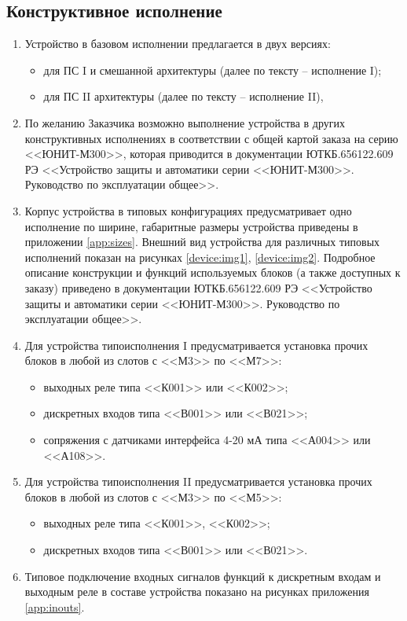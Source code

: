 \color{uniblue}\subsection{Конструктивное исполнение}
\color{black}

\begin{enumerate}

\item
Устройство в базовом исполнении предлагается в двух версиях:
\begin{itemize} 
\item для ПС I и смешанной архитектуры (далее по тексту – исполнение I); 
\item для ПС II архитектуры (далее по тексту – исполнение II), 
\end{itemize} 

\item
По желанию Заказчика возможно выполнение устройства в других конструктивных исполнениях в соответствии с общей картой заказа на серию <<ЮНИТ-М300>>, которая приводится в документации ЮТКБ.656122.609 РЭ <<Устройство защиты и автоматики серии <<ЮНИТ-М300>>. Руководство по эксплуатации общее>>.

\item
Корпус устройства в типовых конфигурациях предусматривает одно исполнение по ширине, габаритные размеры устройства приведены в приложении \ref{app:sizes}. Внешний вид устройства для различных типовых исполнений показан на рисунках \ref{device:img1}, \ref{device:img2}. Подробное описание конструкции и функций используемых блоков (а также доступных к заказу) приведено в документации ЮТКБ.656122.609 РЭ <<Устройство защиты и автоматики серии <<ЮНИТ-М300>>. Руководство по эксплуатации общее>>.

\item
Для устройства типоисполнения I предусматривается установка прочих блоков в любой из слотов с <<М3>> по <<М7>>:
\begin{itemize}
    \item выходных реле типа <<К001>> или <<К002>>;
    \item дискретных входов типа <<В001>> или <<В021>>;
    \item сопряжения с датчиками интерфейса 4-20 мА типа <<А004>> или <<А108>>.
\end{itemize}
\item
Для устройства типоисполнения II предусматривается установка прочих блоков в любой из слотов с <<М3>> по <<М5>>:
\begin{itemize}
    \item выходных реле типа <<К001>>, <<К002>>;
    \item дискретных входов типа <<В001>> или <<В021>>.
\end{itemize}
\item
Типовое подключение входных сигналов функций к дискретным входам и выходным реле в составе устройства показано на рисунках приложения \ref{app:inouts}. 


\end{enumerate}
